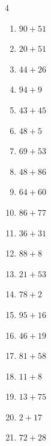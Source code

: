 \begin{multicols}{4}
\begin{enumerate}
  \item $90+51$
        \phantom{$=141$}

  \item $20+51$
        \phantom{$=71$}

  \item $44+26$
        \phantom{$=70$}

  \item $94+9$
        \phantom{$=103$}

  \item $43+45$
        \phantom{$=88$}

  \item $48+5$
        \phantom{$=53$}

  \item $69+53$
        \phantom{$=122$}

  \item $48+86$
        \phantom{$=134$}

  \item $64+60$
        \phantom{$=124$}

  \item $86+77$
        \phantom{$=163$}

  \item $36+31$
        \phantom{$=67$}

  \item $88+8$
        \phantom{$=96$}

  \item $21+53$
        \phantom{$=74$}

  \item $78+2$
        \phantom{$=80$}

  \item $95+16$
        \phantom{$=111$}

  \item $46+19$
        \phantom{$=65$}

  \item $81+58$
        \phantom{$=139$}

  \item $11+8$
        \phantom{$=19$}

  \item $13+75$
        \phantom{$=88$}

  \item $2+17$
        \phantom{$=19$}

  \item $72+28$
        \phantom{$=100$}

\columnbreak %


\end{enumerate}
\end{multicols}
